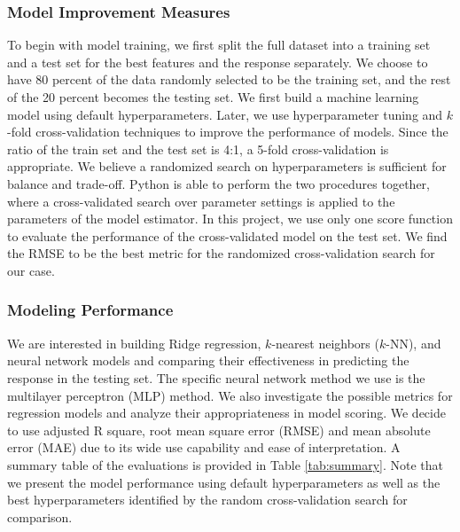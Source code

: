 \documentclass[11pt]{article}
\begin{document}
\subsubsection{Model Improvement Measures}
To begin with model training, we first split the full dataset into a training set and a test set for the best features and the response separately. We choose to have 80 percent of the data randomly selected to be the training set, and the rest of the 20 percent becomes the testing set. We first build a machine learning model using default hyperparameters. Later, we use hyperparameter tuning and $k$-fold cross-validation techniques to improve the performance of models. Since the ratio of the train set and the test set is 4:1, a 5-fold cross-validation is appropriate. We believe a randomized search on hyperparameters is sufficient for balance and trade-off. Python is able to perform the two procedures together, where a cross-validated search over parameter settings is applied to the parameters of the model estimator. In this project, we use only one score function to evaluate the performance of the cross-validated model on the test set. We find the RMSE to be the best metric for the randomized cross-validation search for our case.

\subsubsection{Modeling Performance}\label{sec:performance}
We are interested in building Ridge regression, $k$-nearest neighbors ($k$-NN), and neural network models and comparing their effectiveness in predicting the response in the testing set. The specific neural network method we use is the multilayer perceptron (MLP) method. We also investigate the possible metrics for regression models and analyze their appropriateness in model scoring. We decide to use adjusted R square, root mean square error (RMSE) and mean absolute error (MAE) due to its wide use capability and ease of interpretation. A summary table of the evaluations is provided in Table \ref{tab:summary}. Note that we present the model performance using default hyperparameters as well as the best hyperparameters identified by the random cross-validation search for comparison. 
\end{document}
